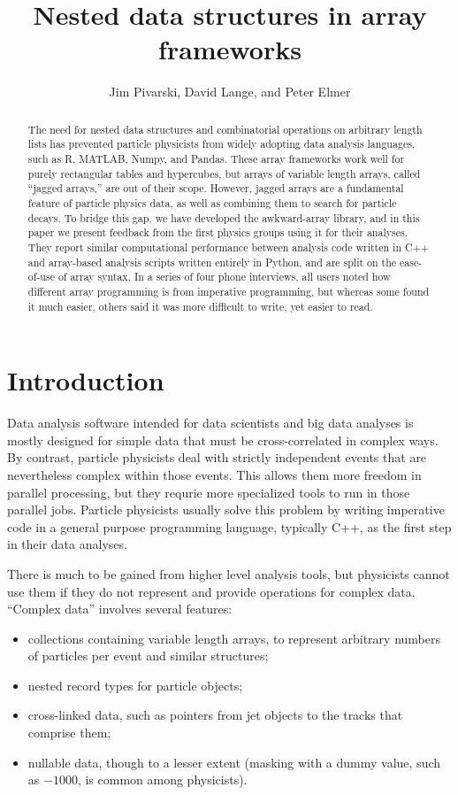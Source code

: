 \documentclass[a4paper]{jpconf}
\begin{document}
\title{Nested data structures in array frameworks}

\author{Jim Pivarski, David Lange, and Peter Elmer}

\address{Princeton University}


\begin{abstract}
The need for nested data structures and combinatorial operations on arbitrary length lists has prevented particle physicists from widely adopting data analysis languages, such as R, MATLAB, Numpy, and Pandas. These array frameworks work well for purely rectangular tables and hypercubes, but arrays of variable length arrays, called ``jagged arrays,'' are out of their scope. However, jagged arrays are a fundamental feature of particle physics data, as well as combining them to search for particle decays. To bridge this gap, we have developed the awkward-array library, and in this paper we present feedback from the first physics groups using it for their analyses. They report similar computational performance between analysis code written in C++ and array-based analysis scripts written entirely in Python, and are split on the ease-of-use of array syntax. In a series of four phone interviews, all users noted how different array programming is from imperative programming, but whereas some found it much easier, others said it was more difficult to write, yet easier to read.
\end{abstract}

\section{Introduction}

Data analysis software intended for data scientists and big data analyses is mostly designed for simple data that must be cross-correlated in complex ways. By contrast, particle physicists deal with strictly independent events that are nevertheless complex within those events. This allows them more freedom in parallel processing, but they requrie more specialized tools to run in those parallel jobs. Particle physicists usually solve this problem by writing imperative code in a general purpose programming language, typically C++, as the first step in their data analyses.

There is much to be gained from higher level analysis tools, but physicists cannot use them if they do not represent and provide operations for complex data. ``Complex data'' involves several features:
\begin{itemize}
\item collections containing variable length arrays, to represent arbitrary numbers of particles per event and similar structures;
\item nested record types for particle objects;
\item cross-linked data, such as pointers from jet objects to the tracks that comprise them;
\item nullable data, though to a lesser extent (masking with a dummy value, such as $-1000$, is common among physicists).
\end{itemize}
\end{document}
